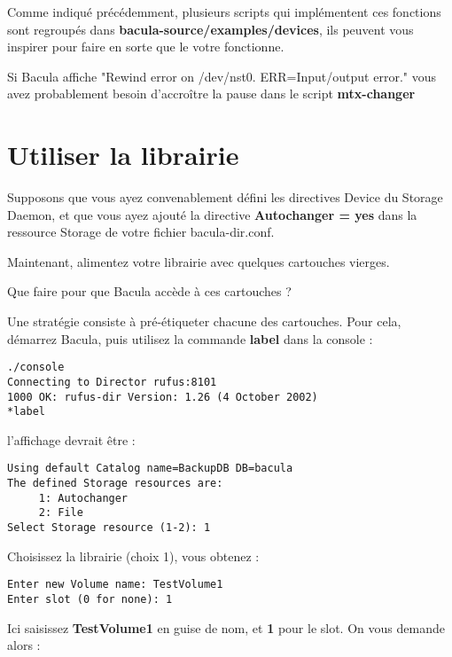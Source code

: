 Comme indiqu\'e pr\'ec\'edemment, plusieurs scripts qui impl\'ementent ces fonctions 
sont regroup\'es dans {\bf \lt{}bacula-source\gt{}/examples/devices}, ils 
peuvent vous inspirer pour faire en sorte que le votre fonctionne.

Si Bacula affiche "Rewind error on /dev/nst0. ERR=Input/output error." vous 
avez probablement besoin d'accro\^itre la pause dans le script {\bf mtx-changer}

\label{using}

\section{Utiliser la librairie}

Supposons que vous ayez convenablement d\'efini les directives Device du 
Storage Daemon, et que vous ayez ajout\'e la directive {\bf Autochanger = yes} 
dans la ressource Storage de votre fichier bacula-dir.conf. 

Maintenant, alimentez votre librairie avec quelques cartouches vierges.

Que faire pour que Bacula acc\`ede \`a ces cartouches ?

Une strat\'egie consiste \`a pr\'e-\'etiqueter chacune des cartouches. Pour cela, 
d\'emarrez Bacula, puis utilisez la commande {\bf label} dans la console :

\footnotesize
\begin{verbatim}
./console
Connecting to Director rufus:8101
1000 OK: rufus-dir Version: 1.26 (4 October 2002)
*label
\end{verbatim}
\normalsize

l'affichage devrait \^etre :

\footnotesize
\begin{verbatim}
Using default Catalog name=BackupDB DB=bacula
The defined Storage resources are:
     1: Autochanger
     2: File
Select Storage resource (1-2): 1
\end{verbatim}
\normalsize

Choisissez la librairie (choix 1), vous obtenez :

\footnotesize
\begin{verbatim}
Enter new Volume name: TestVolume1
Enter slot (0 for none): 1
\end{verbatim}
\normalsize

Ici saisissez {\bf TestVolume1} en guise de nom, et {\bf 1} pour le slot.
On vous demande alors :

